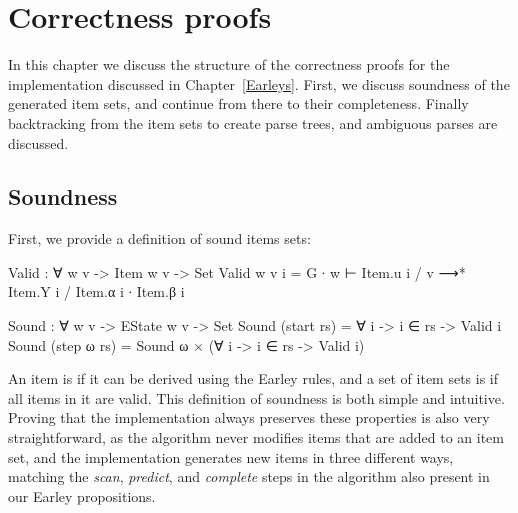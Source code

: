 
\chapter{Correctness proofs} \label{Correctness}

	In this chapter we discuss the structure of the correctness proofs for the
	implementation discussed in Chapter~\ref{Earleys}. First, we discuss
	soundness of the generated item sets, and continue from there to their
	completeness. Finally backtracking from the item sets to create parse
	trees, and ambiguous parses are discussed.

	\section{Soundness}

		First, we provide a definition of sound items sets:

		\begin{code}
			  Valid : ∀ {w v} -> Item w v -> Set
			  Valid {w} {v} i = G ∙ w ⊢ Item.u i / v ⟶* Item.Y i / Item.α i ∙ Item.β i
			
			  Sound : ∀ {w v} -> EState w v -> Set
			  Sound (start rs) = ∀ {i} -> i ∈ rs -> Valid i
			  Sound (step ω rs) = Sound ω × (∀ {i} -> i ∈ rs -> Valid i)
		\end{code}

		An item is  if it can be derived using the Earley rules,
		and a set of item sets is  if all items in it are valid.
		This definition of soundness is both simple and intuitive. Proving that
		the implementation always preserves these properties is also very
		straightforward, as the algorithm never modifies items that are added
		to an item set, and the implementation generates new items in three
		different ways, matching the \emph{scan}, \emph{predict}, and
		\emph{complete} steps in the algorithm also present in our Earley
		propositions.

